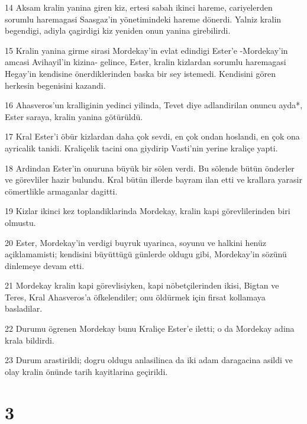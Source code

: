 \par 14 Aksam kralin yanina giren kiz, ertesi sabah ikinci hareme, cariyelerden sorumlu haremagasi Saasgaz'in yönetimindeki hareme dönerdi. Yalniz kralin begendigi, adiyla çagirdigi kiz yeniden onun yanina girebilirdi.
\par 15 Kralin yanina girme sirasi Mordekay'in evlat edindigi Ester'e -Mordekay'in amcasi Avihayil'in kizina- gelince, Ester, kralin kizlardan sorumlu haremagasi Hegay'in kendisine önerdiklerinden baska bir sey istemedi. Kendisini gören herkesin begenisini kazandi.
\par 16 Ahasveros'un kralliginin yedinci yilinda, Tevet diye adlandirilan onuncu ayda*, Ester saraya, kralin yanina götürüldü.
\par 17 Kral Ester'i öbür kizlardan daha çok sevdi, en çok ondan hoslandi, en çok ona ayricalik tanidi. Kraliçelik tacini ona giydirip Vasti'nin yerine kraliçe yapti.
\par 18 Ardindan Ester'in onuruna büyük bir sölen verdi. Bu sölende bütün önderler ve görevliler hazir bulundu. Kral bütün illerde bayram ilan etti ve krallara yarasir cömertlikle armaganlar dagitti.
\par 19 Kizlar ikinci kez toplandiklarinda Mordekay, kralin kapi görevlilerinden biri olmustu.
\par 20 Ester, Mordekay'in verdigi buyruk uyarinca, soyunu ve halkini henüz açiklamamisti; kendisini büyüttügü günlerde oldugu gibi, Mordekay'in sözünü dinlemeye devam etti.
\par 21 Mordekay kralin kapi görevlisiyken, kapi nöbetçilerinden ikisi, Bigtan ve Teres, Kral Ahasveros'a öfkelendiler; onu öldürmek için firsat kollamaya basladilar.
\par 22 Durumu ögrenen Mordekay bunu Kraliçe Ester'e iletti; o da Mordekay adina krala bildirdi.
\par 23 Durum arastirildi; dogru oldugu anlasilinca da iki adam daragacina asildi ve olay kralin önünde tarih kayitlarina geçirildi.

\chapter{3}

